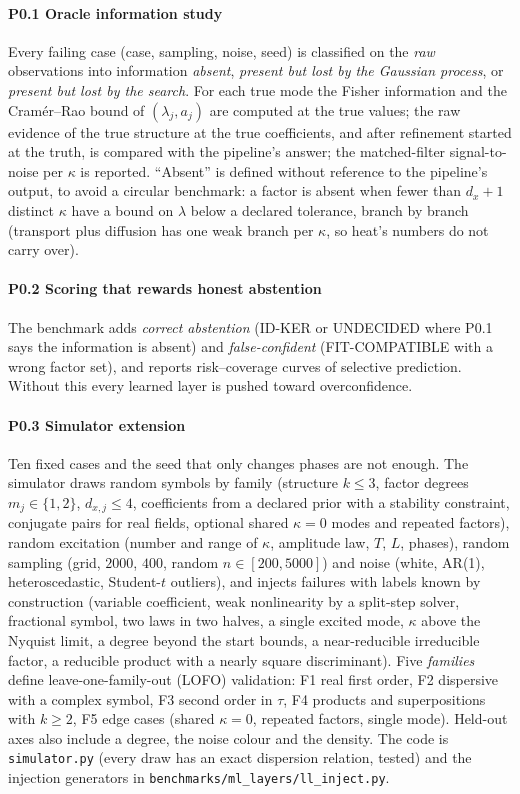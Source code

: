 \documentclass[11pt]{article}
\theoremstyle{plain}
\theoremstyle{definition}
\theoremstyle{remark}
\newcommand{\lab}[1]{\textsf{#1}}           %
\newcommand{\FC}{\lab{FIT-COMPATIBLE}}
\newcommand{\IDK}{\lab{ID-KER}}
\newcommand{\UND}{\lab{UNDECIDED}}
\begin{document}
\paragraph{P0.1 Oracle information study} Every failing case (case, sampling, noise, seed) is classified on the \emph{raw} observations into information \emph{absent}, \emph{present but lost by the Gaussian process}, or \emph{present but lost by the search}.
For each true mode the Fisher information and the Cram\'er--Rao bound of $(\lambda_j,a_j)$ are computed at the true values; the raw evidence of the true structure at the true coefficients, and after refinement started at the truth, is compared with the pipeline's answer; the matched-filter signal-to-noise per $\kappa$ is reported.
``Absent'' is defined without reference to the pipeline's output, to avoid a circular benchmark: a factor is absent when fewer than $d_x+1$ distinct $\kappa$ have a bound on $\lambda$ below a declared tolerance, branch by branch (transport plus diffusion has one weak branch per $\kappa$, so heat's numbers do not carry over).

\paragraph{P0.2 Scoring that rewards honest abstention} The benchmark adds \emph{correct abstention} (\IDK{} or \UND{} where P0.1 says the information is absent) and \emph{false-confident} (\FC{} with a wrong factor set), and reports risk--coverage curves of selective prediction.
Without this every learned layer is pushed toward overconfidence.

\paragraph{P0.3 Simulator extension} Ten fixed cases and the seed that only changes phases are not enough. The simulator draws random symbols by family (structure $k\le3$, factor degrees $m_j\in\{1,2\}$, $d_{x,j}\le4$, coefficients from a declared prior with a stability constraint, conjugate pairs for real fields, optional shared $\kappa=0$ modes and repeated factors),
random excitation (number and range of $\kappa$, amplitude law, $T$, $L$, phases), random sampling (grid, $2000$, $400$, random $n\in[200,5000]$) and noise (white, AR(1), heteroscedastic, Student-$t$ outliers), and injects failures with labels known by construction (variable coefficient, weak nonlinearity by a split-step solver, fractional symbol, two laws in two halves, a single excited mode,
$\kappa$ above the Nyquist limit, a degree beyond the start bounds, a near-reducible irreducible factor, a reducible product with a nearly square discriminant). Five \emph{families} define leave-one-family-out (LOFO) validation:
F1 real first order, F2 dispersive with a complex symbol, F3 second order in $\tau$, F4 products and superpositions with $k\ge2$, F5 edge cases (shared $\kappa=0$, repeated factors, single mode). Held-out axes also include a degree, the noise colour and the density.
The code is \texttt{simulator.py} (every draw has an exact dispersion relation, tested) and the injection generators in \texttt{benchmarks/ml\_layers/ll\_inject.py}.
\end{document}
